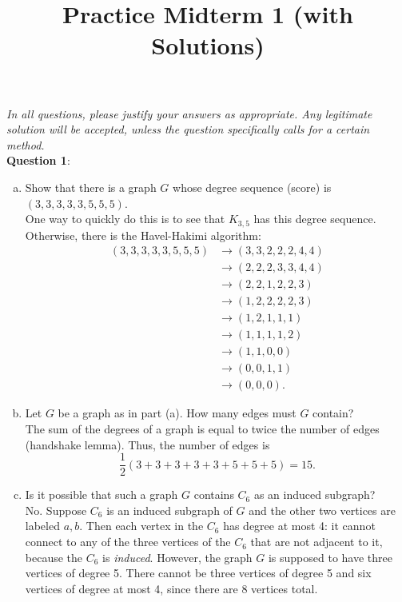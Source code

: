\documentclass{amsart}
\title{Practice Midterm 1 (with Solutions)}
\begin{document}
	
	\maketitle 
	
	\textit{In all questions, please justify your answers as appropriate. Any legitimate solution will be accepted, unless the question specifically calls for a certain method.}\\
	
	\noindent \textbf{Question 1}: 
	\begin{enumerate}[(a)]
		\item Show that there is a graph $G$ whose degree sequence (score) is $(3,3,3,3,3,5,5,5)$. \\
		
		One way to quickly do this is to see that $K_{3,5}$ has this degree sequence. Otherwise, there is the Havel-Hakimi algorithm:
		\begin{align*}
			(3,3,3,3,3,5,5,5) &\to (3,3,2,2,2,4,4)\\
			&\to (2,2,2,3,3,4,4) \\
			&\to (2,2,1,2,2,3) \\
			&\to (1,2,2,2,2,3) \\
			&\to (1,2,1,1,1)\\
			&\to (1,1,1,1,2)\\
			&\to (1,1,0,0)\\
			&\to (0,0,1,1)\\
			&\to (0,0,0).
		\end{align*}
		
		\item Let $G$ be a graph as in part (a). How many edges must $G$ contain? \\
		
		The sum of the degrees of a graph is equal to twice the number of edges (handshake lemma). Thus, the number of edges is 
		$$
		\frac{1}{2}(3+3+3+3+3+5+5+5) = 15.
		$$
		\vspace{50px}
		
		\item Is it possible that such a graph $G$ contains $C_6$ as an induced subgraph? \\
		
		No. Suppose $C_6$ is an induced subgraph of $G$ and the other two vertices are labeled $a,b$. Then each vertex in the $C_6$ has degree at most 4: it cannot connect to any of the three vertices of the $C_6$ that are not adjacent to it, because the $C_6$ is \textit{induced}. However, the graph $G$ is supposed to have three vertices of degree 5. There cannot be three vertices of degree 5 and six vertices of degree at most 4, since there are 8 vertices total.
	\end{enumerate}
	
\end{document}
